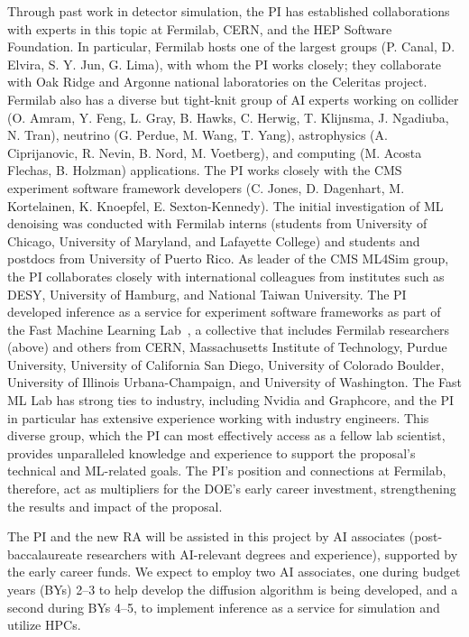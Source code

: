 Through past work in detector simulation, the PI has established collaborations with experts in this topic at Fermilab, CERN, and the HEP Software Foundation.
In particular, Fermilab hosts one of the largest \GEANTfour groups (P. Canal, D. Elvira, S. Y. Jun, G. Lima), with whom the PI works closely;
they collaborate with Oak Ridge and Argonne national laboratories on the Celeritas project.
Fermilab also has a diverse but tight-knit group of AI experts working on collider (O. Amram, Y. Feng, L. Gray, B. Hawks, C. Herwig, T. Klijnsma, J. Ngadiuba, N. Tran),
neutrino (G. Perdue, M. Wang, T. Yang), astrophysics (A. Ciprijanovic, R. Nevin, B. Nord, M. Voetberg), and computing (M. Acosta Flechas, B. Holzman) applications.
The PI works closely with the CMS experiment software framework developers (C. Jones, D. Dagenhart, M. Kortelainen, K. Knoepfel, E. Sexton-Kennedy).
The initial investigation of ML denoising was conducted with Fermilab interns (students from University of Chicago, University of Maryland, and Lafayette College) and students and postdocs from University of Puerto Rico.
As leader of the CMS ML4Sim group, the PI collaborates closely with international colleagues from institutes such as DESY, University of Hamburg, and National Taiwan University.
The PI developed inference as a service for experiment software frameworks as part of the Fast Machine Learning Lab~\cite{FML},
a collective that includes Fermilab researchers (above)
and others from CERN, Massachusetts Institute of Technology, Purdue University, University of California San Diego, University of Colorado Boulder, University of Illinois Urbana-Champaign, and University of Washington.
The Fast ML Lab has strong ties to industry, including Nvidia and Graphcore, and the PI in particular has extensive experience working with industry engineers.
This diverse group, which the PI can most effectively access as a fellow lab scientist,
provides unparalleled knowledge and experience to support the proposal's technical and ML-related goals.
The PI's position and connections at Fermilab, therefore, act as multipliers for the DOE's early career investment, strengthening the results and impact of the proposal.

The PI and the new RA will be assisted in this project by AI associates (post-baccalaureate researchers with AI-relevant degrees and experience), supported by the early career funds.
We expect to employ two AI associates, one during budget years (BYs) 2--3 to help develop the diffusion algorithm is being developed, and a second during BYs 4--5, to implement inference as a service for simulation and utilize HPCs.